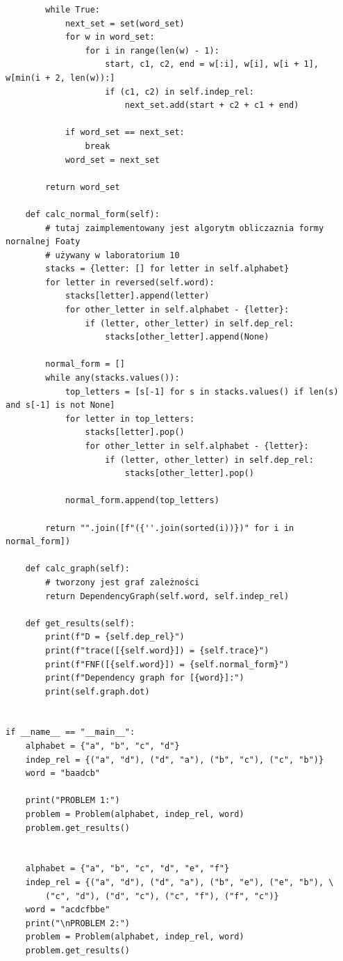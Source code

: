 \documentclass{article}
\begin{document}
\begin{verbatim}
        while True:
            next_set = set(word_set)
            for w in word_set:
                for i in range(len(w) - 1):
                    start, c1, c2, end = w[:i], w[i], w[i + 1], w[min(i + 2, len(w)):]
                    if (c1, c2) in self.indep_rel:
                        next_set.add(start + c2 + c1 + end)

            if word_set == next_set:
                break
            word_set = next_set

        return word_set

    def calc_normal_form(self):
        # tutaj zaimplementowany jest algorytm obliczaznia formy nornalnej Foaty
        # używany w laboratorium 10
        stacks = {letter: [] for letter in self.alphabet}
        for letter in reversed(self.word):
            stacks[letter].append(letter)
            for other_letter in self.alphabet - {letter}:
                if (letter, other_letter) in self.dep_rel:
                    stacks[other_letter].append(None)

        normal_form = []
        while any(stacks.values()):
            top_letters = [s[-1] for s in stacks.values() if len(s) and s[-1] is not None]
            for letter in top_letters:
                stacks[letter].pop()
                for other_letter in self.alphabet - {letter}:
                    if (letter, other_letter) in self.dep_rel:
                        stacks[other_letter].pop()
            
            normal_form.append(top_letters)

        return "".join([f"({''.join(sorted(i))})" for i in normal_form])

    def calc_graph(self):
        # tworzony jest graf zależności
        return DependencyGraph(self.word, self.indep_rel)

    def get_results(self):
        print(f"D = {self.dep_rel}")
        print(f"trace([{self.word}]) = {self.trace}")
        print(f"FNF([{self.word}]) = {self.normal_form}")
        print(f"Dependency graph for [{word}]:")
        print(self.graph.dot)


if __name__ == "__main__":
    alphabet = {"a", "b", "c", "d"}
    indep_rel = {("a", "d"), ("d", "a"), ("b", "c"), ("c", "b")}
    word = "baadcb"

    print("PROBLEM 1:")
    problem = Problem(alphabet, indep_rel, word)
    problem.get_results()


    alphabet = {"a", "b", "c", "d", "e", "f"}
    indep_rel = {("a", "d"), ("d", "a"), ("b", "e"), ("e", "b"), \
        ("c", "d"), ("d", "c"), ("c", "f"), ("f", "c")}
    word = "acdcfbbe"
    print("\nPROBLEM 2:")
    problem = Problem(alphabet, indep_rel, word)
    problem.get_results()
\end{verbatim}
\end{document}
